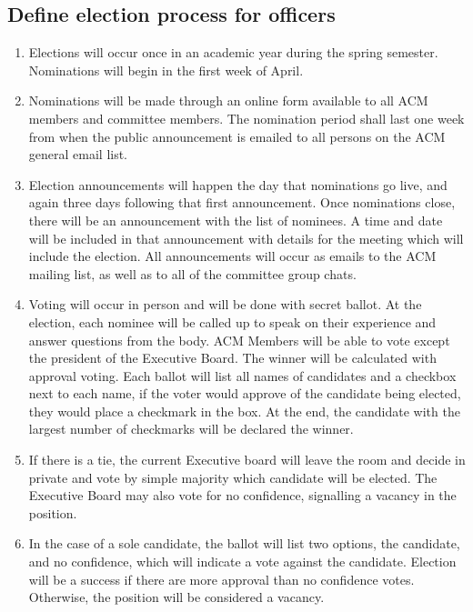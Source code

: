   \subsection{Define election process for officers}
    \begin{enumerate}[label=\arabic*.]
      \item Elections will occur once in an academic year during the spring
      semester. Nominations will begin in the first week of April.
      \item Nominations will be made through an online form available to all ACM
      members and committee members. The nomination period shall last one week
      from when the public announcement is emailed to all persons on the ACM
      general email list.
      \item Election announcements will happen the day that nominations go live,
      and again three days following that first announcement. Once nominations
      close, there will be an announcement with the list of nominees. A time and
      date will be included in that announcement with details for the meeting
      which will include the election. All announcements will occur as emails to
      the ACM mailing list, as well as to all of the committee group chats.
      \item Voting will occur in person and will be done with secret ballot. At
      the election, each nominee will be called up to speak on their experience
      and answer questions from the body. ACM Members will be able to vote
      except the president of the Executive Board. The winner will be calculated
      with approval voting. Each ballot will list all names of candidates and a
      checkbox next to each name, if the voter would approve of the candidate
      being elected, they would place a checkmark in the box. At the end, the
      candidate with the largest number of checkmarks will be declared the
      winner.
      \item If there is a tie, the current Executive board will leave the room
      and decide in private and vote by simple majority which candidate will be
      elected. The Executive Board may also vote for no confidence, signalling a
      vacancy in the position.
      \item In the case of a sole candidate, the ballot will list two options,
      the candidate, and no confidence, which will indicate a vote against the
      candidate. Election will be a success if there are more approval than no
      confidence votes. Otherwise, the position will be considered a vacancy.

\end{enumerate}
